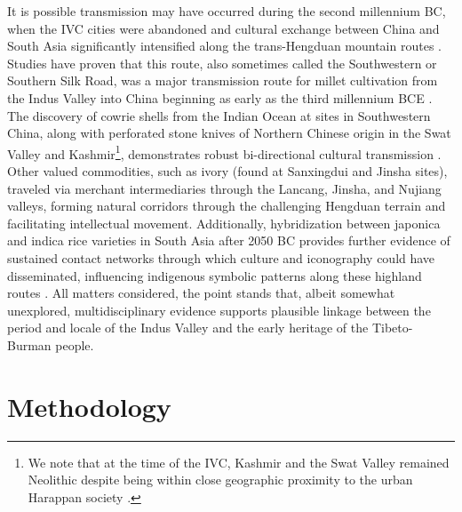 \documentclass[11pt,a4paper,oneside]{report}
\begin{document}
It is possible transmission may have occurred during the second millennium BC, when the IVC cities were abandoned and cultural exchange between China and South Asia significantly intensified along the trans-Hengduan mountain routes \cite{ma_understanding_2023}. Studies have proven that this route, also sometimes called the Southwestern or Southern Silk Road, was a major transmission route for millet cultivation from the Indus Valley into China beginning as early as the third millennium BCE \cite{jacques_linguistic_2024}. The discovery of cowrie shells from the Indian Ocean at sites in Southwestern China, along with perforated stone knives of Northern Chinese origin in the Swat Valley and Kashmir\footnote{We note that at the time of the IVC, Kashmir and the Swat Valley remained Neolithic despite being within close geographic proximity to the urban Harappan society \cite{betts_northern_2019}.}, demonstrates robust bi-directional cultural transmission \cite{gao_new_2021}. Other valued commodities, such as ivory (found at Sanxingdui and Jinsha sites), traveled via merchant intermediaries through the Lancang, Jinsha, and Nujiang valleys, forming natural corridors through the challenging Hengduan terrain and facilitating intellectual movement. Additionally, hybridization between japonica and indica rice varieties in South Asia after 2050 BC provides further evidence of sustained contact networks through which culture and iconography could have disseminated, influencing indigenous symbolic patterns along these highland routes \cite{fuller_consilience_2010}. All matters considered, the point stands that, albeit somewhat unexplored, multidisciplinary evidence supports plausible linkage between the period and locale of the Indus Valley and the early heritage of the Tibeto-Burman people.

\chapter{Methodology}
\label{material-and-methods}
\end{document}
